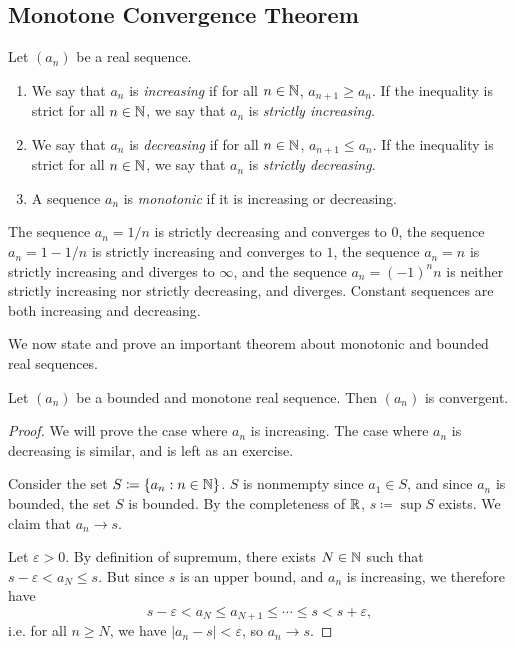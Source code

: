 \documentclass[../analysis1.tex]{subfiles}
\begin{document}
\subsection{Monotone Convergence Theorem}
\begin{definition}
    \begin{shaded*}
        Let $(a_n)$ be a real sequence.
        \begin{enumerate}
            \item[1.] We say that $a_n$ is \textit{increasing} if for all $n\in\mathbb{N}$, $a_{n+1}\ge a_n$. If the inequality is strict for all $n\in\mathbb{N}$, we say that $a_n$ is \textit{strictly increasing}.
            \item[2.] We say that $a_n$ is \textit{decreasing} if for all $n\in\mathbb{N}$, $a_{n+1}\le a_n$. If the inequality is strict for all $n\in\mathbb{N}$, we say that $a_n$ is \textit{strictly decreasing}.
            \item[3.] A sequence $a_n$ is \textit{monotonic} if it is increasing or decreasing. 
        \end{enumerate}
    \end{shaded*}
\end{definition}
\begin{example}
    The sequence $a_n=1/n$ is strictly decreasing and converges to $0$, the sequence $a_n=1-1/n$ is strictly increasing and converges to $1$, the sequence $a_n=n$ is strictly increasing and diverges to $\infty$,
    and the sequence $a_n=(-1)^nn$ is neither strictly increasing nor strictly decreasing, and diverges. Constant sequences are both increasing and decreasing.
\end{example}
We now state and prove an important theorem about monotonic and bounded real sequences.
\begin{theorem}
\label{thm:mct}
    \begin{shaded*}
        Let $(a_n)$ be a bounded and monotone real sequence. Then $(a_n)$ is convergent.
    \end{shaded*}
\end{theorem}
\begin{proof}
    We will prove the case where $a_n$ is increasing. The case where $a_n$ is decreasing is similar, and is left as an exercise.\par
    Consider the set $S\coloneqq\{a_n:n\in\mathbb{N}\}$. $S$ is nonmempty since $a_1\in S$, and since $a_n$ is bounded, the set $S$ is bounded. By the completeness of $\mathbb{R}$, $s\coloneqq \sup S$ exists. We claim that $a_n\to s$.\par
    Let $\varepsilon>0$. By definition of supremum, there exists $N\in\mathbb{N}$ such that $s-\varepsilon<a_N\le s$. But since $s$ is an upper bound, and $a_n$ is increasing, we therefore have $$s-\varepsilon<a_N\le a_{N+1}\le \cdots\le s<s+\varepsilon,$$
    i.e. for all $n\ge N$, we have $|a_n-s|<\varepsilon$, so $a_n\to s$.\qedhere
\end{proof}
\end{document}
